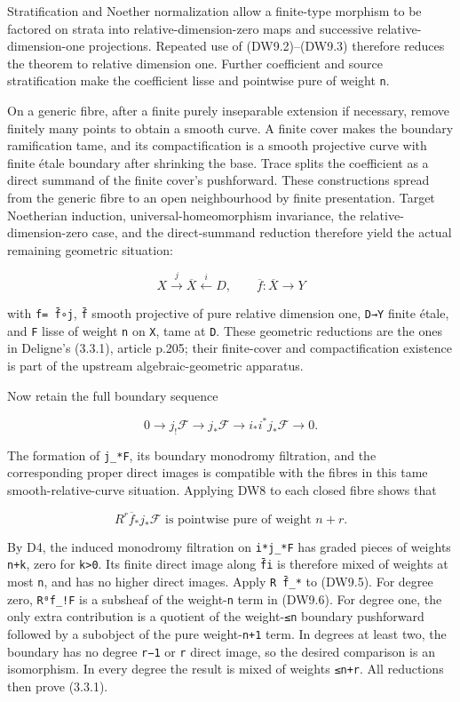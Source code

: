 \documentclass[
]{report}
\begin{document}
Stratification and Noether normalization allow a finite-type morphism to
be factored on strata into relative-dimension-zero maps and successive
relative-dimension-one projections. Repeated use of (DW9.2)--(DW9.3)
therefore reduces the theorem to relative dimension one. Further
coefficient and source stratification make the coefficient lisse and
pointwise pure of weight \texttt{n}.

On a generic fibre, after a finite purely inseparable extension if
necessary, remove finitely many points to obtain a smooth curve. A
finite cover makes the boundary ramification tame, and its
compactification is a smooth projective curve with finite étale boundary
after shrinking the base. Trace splits the coefficient as a direct
summand of the finite cover's pushforward. These constructions spread
from the generic fibre to an open neighbourhood by finite presentation.
Target Noetherian induction, universal-homeomorphism invariance, the
relative-dimension-zero case, and the direct-summand reduction therefore
yield the actual remaining geometric situation:

\[
X\xrightarrow{j}\overline X\xleftarrow{i}D,
\qquad\overline f:\overline X\to Y
\tag{DW9.4}
\]

with \texttt{f=\ f̄∘j}, \texttt{f̄} smooth projective of pure relative
dimension one, \texttt{D→Y} finite étale, and \texttt{F} lisse of weight
\texttt{n} on \texttt{X}, tame at \texttt{D}. These geometric reductions
are the ones in Deligne's (3.3.1), article p.205; their finite-cover and
compactification existence is part of the upstream algebraic-geometric
apparatus.

Now retain the full boundary sequence

\[
0\to j_!\mathcal F\to j_*\mathcal F
\to i_*i^*j_*\mathcal F\to0.
\tag{DW9.5}
\]

The formation of \texttt{j\_*F}, its boundary monodromy filtration, and
the corresponding proper direct images is compatible with the fibres in
this tame smooth-relative-curve situation. Applying DW8 to each closed
fibre shows that

\[
R^r\overline f_*j_*\mathcal F
\text{ is pointwise pure of weight }n+r.
\tag{DW9.6}
\]

By D4, the induced monodromy filtration on \texttt{i*j\_*F} has graded
pieces of weights \texttt{n+k}, zero for \texttt{k\textgreater{}0}. Its
finite direct image along \texttt{f̄i} is therefore mixed of weights at
most \texttt{n}, and has no higher direct images. Apply \texttt{R\ f̄\_*}
to (DW9.5). For degree zero, \texttt{R⁰f\_!F} is a subsheaf of the
weight-\texttt{n} term in (DW9.6). For degree one, the only extra
contribution is a quotient of the weight-\texttt{≤n} boundary
pushforward followed by a subobject of the pure weight-\texttt{n+1}
term. In degrees at least two, the boundary has no degree \texttt{r−1}
or \texttt{r} direct image, so the desired comparison is an isomorphism.
In every degree the result is mixed of weights \texttt{≤n+r}. All
reductions then prove (3.3.1).
\end{document}
